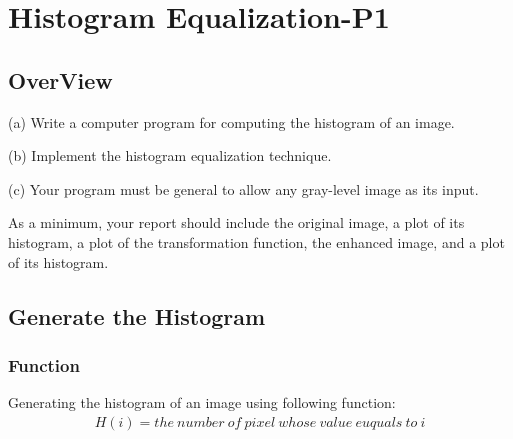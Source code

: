 \documentclass[11pt,oneside]{book}
\begin{document}


\tableofcontents

\chapter{Histogram Equalization-P1}

\section{OverView}
(a) Write a computer program for computing the histogram of an image.

(b) Implement the histogram equalization technique.

(c) Your program must be general to allow any gray-level image as its input.

As a minimum, your report should include the original image, a plot of its histogram, a plot of the transformation function, the enhanced image, and a plot of its histogram.
\section{Generate the Histogram}
\subsection{Function}
Generating the histogram of an image using following function:\\
\begin{align}
H(i) = the\ number\ of\ pixel\ whose\ value\ euquals\ to\ i
\end{align}
\end{document}
